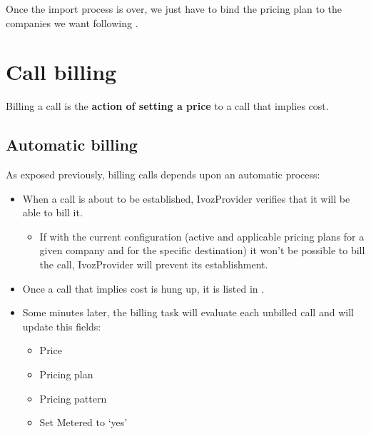 \documentclass[letterpaper,10pt,english]{sphinxmanual}
\begin{document}
Once the import process is over, we just have to bind the pricing plan to
the companies we want following {\hyperref[external_outgoing_calls/noplan_nocall:pricing\string-plan\string-to\string-company]{}}.


\section{Call billing}
\label{billing_and_invoices/bill_a_call::doc}\label{billing_and_invoices/bill_a_call:call-billing}
Billing a call is the \textbf{action of setting a price} to a call that implies cost.


\subsection{Automatic billing}
\label{billing_and_invoices/bill_a_call:automatic-billing}
As exposed previously, billing calls depends upon an automatic process:
\begin{itemize}
\item {} 
When a call is about to be established, IvozProvider verifies that it will be
able to bill it.
\begin{itemize}
\item {} 
If with the current configuration (active and applicable pricing plans for
a given company and for the specific destination) it won't be possible to
bill the call, IvozProvider will prevent its establishment.

\end{itemize}

\item {} 
Once a call that implies cost is hung up, it is listed in {\hyperref[billing_and_invoices/billable_calls:billable\string-calls]{}}.

\item {} 
Some minutes later, the billing task will evaluate each unbilled call and will
update this fields:
\begin{itemize}
\item {} 
Price

\item {} 
Pricing plan

\item {} 
Pricing pattern

\item {} 
Set Metered to `yes'

\end{itemize}

\end{itemize}
\end{document}
